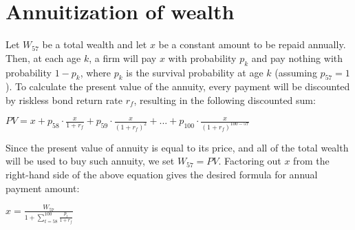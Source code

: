 \chapter{Annuitization of wealth}
\label{appd}

Let $W_{57}$ be a total wealth and let $x$ be a constant amount to be repaid annually. Then, at each age $k$, a firm will pay $x$ with probability $p_k$ and pay nothing with probability $1-p_k$, where $p_k$ is the survival probability at age $k$ (assuming $p_{57} = 1$). To calculate the present value of the annuity, every payment will be discounted by riskless bond return rate $r_f$, resulting in the following discounted sum:

\begin{center}
	$PV = x + p_{58} \cdot \frac{x}{1+r_f} + p_{59} \cdot \frac{x}{(1+r_f)^2} + ... + p_{100} \cdot \frac{x}{(1+r_f)^{100-57}}$
\end{center}

Since the present value of annuity is equal to its price, and all of the total wealth will be used to buy such annuity, we set $W_{57}=PV$. Factoring out $x$ from the right-hand side of the above equation gives the desired formula for annual payment amount:

\begin{center}
	$x = \frac{W_{57}}{1+\displaystyle\sum^{100}_{t=58} \frac{p_t}{1+r_f}}$ 
\end{center}
